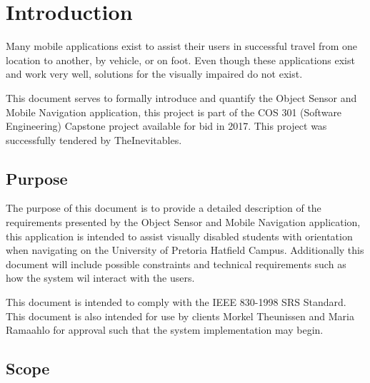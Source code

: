 
\section{Introduction}
		Many mobile applications exist to assist their users in successful travel from one location to another, by vehicle, or on foot.
		Even though these applications exist and work very well, solutions for the visually impaired do not exist.\\ \par \noindent
		This document serves to formally introduce and quantify the Object Sensor and Mobile Navigation application, this project is part of the COS 301 (Software Engineering) Capstone project available for bid in 2017. This project was successfully tendered by TheInevitables.
	
	\subsection{Purpose}
		The purpose of this document is to provide a detailed description of the requirements presented by the Object Sensor and Mobile Navigation application, this application is intended to assist visually disabled students with orientation when navigating on the University of Pretoria Hatfield Campus. Additionally this document will include possible constraints and technical requirements such as how the system wil interact with the users. \\ \par \noindent
		This document is intended to comply with the IEEE 830-1998 SRS Standard. This document is also intended for use by clients Morkel Theunissen and Maria Ramaahlo for approval such that the system implementation may begin.
		
	\subsection{Scope}

